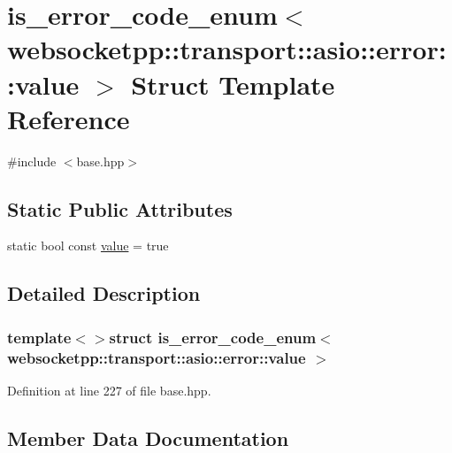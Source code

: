 \hypertarget{structis__error__code__enum_3_01websocketpp_1_1transport_1_1asio_1_1error_1_1value_01_4}{}\section{is\+\_\+error\+\_\+code\+\_\+enum$<$ websocketpp\+:\+:transport\+:\+:asio\+:\+:error\+:\+:value $>$ Struct Template Reference}
\label{structis__error__code__enum_3_01websocketpp_1_1transport_1_1asio_1_1error_1_1value_01_4}


{\ttfamily \#include $<$base.\+hpp$>$}

\subsection*{Static Public Attributes}
\begin{DoxyCompactItemize}
\item 
static bool const \hyperlink{structis__error__code__enum_3_01websocketpp_1_1transport_1_1asio_1_1error_1_1value_01_4_aae5dbb38b63c54b30712a8d9437b4aeb}{value} = true
\end{DoxyCompactItemize}


\subsection{Detailed Description}
\subsubsection*{template$<$$>$struct is\+\_\+error\+\_\+code\+\_\+enum$<$ websocketpp\+::transport\+::asio\+::error\+::value $>$}



Definition at line 227 of file base.\+hpp.



\subsection{Member Data Documentation}
\hypertarget{structis__error__code__enum_3_01websocketpp_1_1transport_1_1asio_1_1error_1_1value_01_4_aae5dbb38b63c54b30712a8d9437b4aeb}{}
